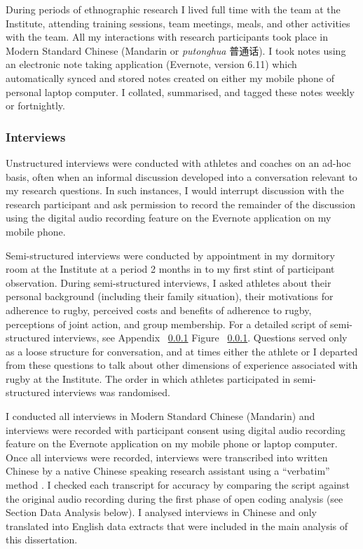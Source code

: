 During periods of ethnographic research I lived full time with the team at the Institute, attending training sessions, team meetings, meals, and other activities with the team.   All my interactions with research participants took place in Modern Standard Chinese (Mandarin or \textit{putonghua} 普通话).  I took notes using an electronic note taking application (Evernote, version 6.11) which automatically synced and stored notes created on either my mobile phone of personal laptop computer. I collated, summarised, and tagged these notes weekly or fortnightly.


  \subsubsection{Interviews}

Unstructured interviews were conducted with athletes and coaches on an ad-hoc basis, often when an informal discussion developed into a conversation relevant to my research questions. In such instances, I would interrupt discussion with the research participant and ask permission to record the remainder of the discussion using the digital audio recording feature on the Evernote application on my mobile phone.

Semi-structured interviews were conducted by appointment in my dormitory room at the Institute at a period 2 months in to my first stint of participant observation.  During semi-structured interviews, I asked athletes about their personal background (including their family situation), their motivations for adherence to rugby, perceived costs and benefits of adherence to rugby, perceptions of joint action, and group membership. For a detailed script of semi-structured interviews, see Appendix ~\ref{} Figure ~\ref{}.  Questions served only as a loose structure for conversation, and at times either the athlete or I departed from these questions to talk about other dimensions of experience associated with rugby at the Institute.  The order in which athletes participated in semi-structured interviews was randomised.

I conducted all interviews in Modern Standard Chinese (Mandarin) and interviews were recorded with participant consent using digital audio recording feature on the Evernote application on my mobile phone or laptop computer.  Once all interviews were recorded, interviews were transcribed into written Chinese by a native Chinese speaking research assistant using a ``verbatim'' method \citep[i.e., including an account of all verbal and important nonverbal (coughs, pauses, etc) utterances, see][269-70]{Poland2003}.  I checked each transcript for accuracy by comparing the script against the original audio recording during the first phase of open coding analysis (see Section Data Analysis below). I analysed interviews in Chinese and only translated into English data extracts that were included in the main analysis of this dissertation.

